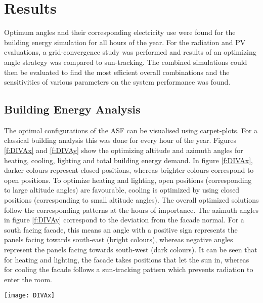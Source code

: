 \chapter{Results}
\label{ch:results}

Optimum angles and their corresponding electricity use were found for the building energy simulation for all hours of the year. For the radiation and PV evaluations, a grid-convergence study was performed and results of an optimizing angle strategy was compared to sun-tracking. The combined simulations could then be evaluated to find the most efficient overall combinations and the sensitivities of various parameters on the system performance was found.

\section{Building Energy Analysis}
\label{s:buildingResults}
	
	The optimal configurations of the ASF can be visualised using carpet-plots. For a classical building analysis this was done for every hour of the year. Figures \ref{f:DIVAx} and \ref{f:DIVAy} show the optimizing altitude and azimuth angles for heating, cooling, lighting and total building energy demand. In figure \ref{f:DIVAx}, darker colours represent closed positions, whereas brighter colours correspond to open positions. To optimize heating and lighting, open positions (corresponding to large altitude angles) are favourable, cooling is optimized by using closed positions (corresponding to small altitude angles). The overall optimized solutions follow the corresponding patterns at the hours of importance. The azimuth angles in figure \ref{f:DIVAy} correspond to the deviation from the facade normal. For a south facing facade, this means an angle with a positive sign represents the panels facing towards south-east (bright colours), whereas negative angles represent the panels facing towards south-west (dark colours). It can be seen that for heating and lighting, the facade takes positions that let the sun in, whereas for cooling the facade follows a sun-tracking pattern which prevents radiation to enter the room. 

	\begin{figure*}
		\begin{center}
		\texttt{[image: DIVAx]}
		\caption{Carpet plots detailing the optimal altitude angles to minimise the (a) heating demand, (b) cooling demand, (c) lighting demand, and (d) total building energy demand. Darker colours represent closed positions, whereas brighter colors correspond to open positions. To optimize heating and lighting, open positions are favorable, cooling is optimized by using closed positions.}
		\label{f:DIVAx}
		\end{center}
	\end{figure*}


